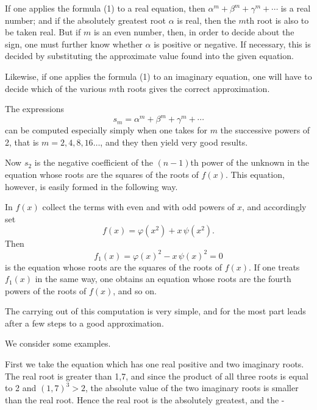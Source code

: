 If one applies the formula (1) to a real equation, then $\alpha^m + \beta^m + \gamma^m + \cdots$ is a real number; and if the absolutely greatest root $\alpha$ is real, then the $m$th root is also to be taken real. But if $m$ is an even number, then, in order to decide about the sign, one must further know whether $\alpha$ is positive or negative. If necessary, this is decided by substituting the approximate value found into the given equation.

Likewise, if one applies the formula (1) to an imaginary equation, one will have to decide which of the various $m$th roots gives the correct approximation.

The expressions
\[
s_m = \alpha^m + \beta^m + \gamma^m + \cdots
\]
can be computed especially simply when one takes for $m$ the successive powers of 2, that is $m = 2, 4, 8, 16 \ldots$, and they then yield very good results.

Now $s_2$ is the negative coefficient of the $(n-1)$th power of the unknown in the equation whose roots are the squares of the roots of $f(x)$. This equation, however, is easily formed in the following way.

In $f(x)$ collect the terms with even and with odd powers of $x$, and accordingly set
\[
f(x) = \varphi(x^2) + x\,\psi(x^2).
\]
Then
\[
f_1(x) = \varphi(x)^2 - x\,\psi(x)^2 = 0
\]
is the equation whose roots are the squares of the roots of $f(x)$. If one treats $f_1(x)$ in the same way, one obtains an equation whose roots are the fourth powers of the roots of $f(x)$, and so on.

The carrying out of this computation is very simple, and for the most part leads after a few steps to a good approximation.

We consider some examples.

First we take the equation
which has one real positive and two imaginary roots. The real root is greater than 1,7, and since the product of all three roots is equal to 2 and $(1,7)^3 > 2$, the absolute value of the two imaginary roots is smaller than the real root. Hence the real root is the absolutely greatest, and the -
